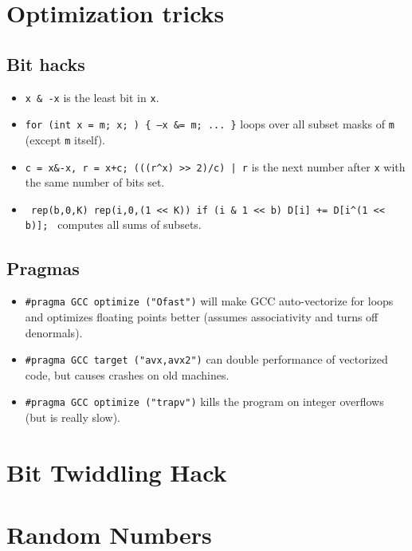 \section{Optimization tricks}
	\subsection{Bit hacks}
		\begin{itemize}
			\item \texttt{x \& -x} is the least bit in \texttt{x}.
			\item \texttt{for (int x = m; x; ) \{ --x \&= m; ... \}} loops over all subset masks of \texttt{m} (except \texttt{m} itself).
			\item \texttt{c = x\&-x, r = x+c; (((r\^{}x) >> 2)/c) | r} is the next number after \texttt{x} with the same number of bits set.
			\item \texttt{ rep(b,0,K) rep(i,0,(1 << K)) if (i \& 1 << b) D[i] += D[i\^{}(1 << b)]; } computes all sums of subsets.
		\end{itemize}
	\subsection{Pragmas}
		\begin{itemize}
			\item \lstinline{#pragma GCC optimize ("Ofast")} will make GCC auto-vectorize for loops and optimizes floating points better (assumes associativity and turns off denormals).
			\item \lstinline{#pragma GCC target ("avx,avx2")} can double performance of vectorized code, but causes crashes on old machines.
			\item \lstinline{#pragma GCC optimize ("trapv")} kills the program on integer overflows (but is really slow).
		\end{itemize}
	
\section {Bit Twiddling Hack}
\section {Random Numbers}
